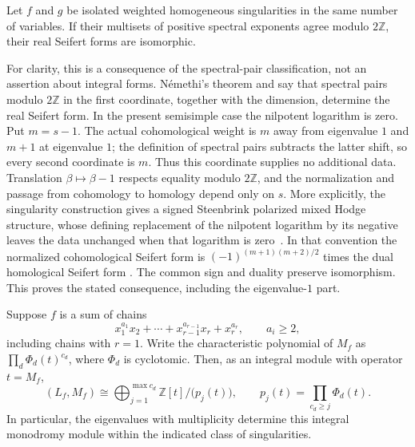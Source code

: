 \begin{theorem}\label{bg:real}
Let $f$ and $g$ be isolated weighted homogeneous singularities in the same
number of variables.  If their multisets of positive spectral exponents
agree modulo $2\mathbb Z$, their real Seifert forms are isomorphic.
\end{theorem}

For clarity, this is a consequence of the spectral-pair classification,
not an assertion about integral forms.  N\'emethi's theorem
\cite[Theorem~6.5]{Nemethi1995} and
\cite[Theorem~4.4(b)]{BalnojanHertling2019} say that spectral pairs modulo
$2\mathbb Z$ in the first coordinate, together with the dimension,
determine the real Seifert form.  In the present semisimple case the
nilpotent logarithm is zero.  Put $m=s-1$.  The actual cohomological weight
is $m$ away from eigenvalue $1$ and $m+1$ at eigenvalue $1$; the definition
of spectral pairs subtracts the latter shift, so every second coordinate
is $m$.  Thus this coordinate supplies no additional data.  Translation
$\beta\mapsto\beta-1$ respects equality modulo $2\mathbb Z$, and the
normalization and passage from cohomology to homology depend only on $s$.
More explicitly, the singularity construction gives a signed Steenbrink
polarized mixed Hodge structure, whose defining replacement of the
nilpotent logarithm by its negative leaves the data unchanged when that
logarithm is zero~\cite[Definition~6.1 and Remark~6.2]{BalnojanHertling2019}.
In that convention the normalized cohomological Seifert form is
$(-1)^{(m+1)(m+2)/2}$ times the dual homological Seifert form
\cite[Equation~(6.14)]{BalnojanHertling2019}.  The common sign and duality
preserve isomorphism.  This proves the stated consequence, including the
eigenvalue-$1$ part.

\begin{theorem}\label{bg:orlik}
Suppose $f$ is a sum of chains
\[
 x_1^{a_1}x_2+\cdots+x_{r-1}^{a_{r-1}}x_r+x_r^{a_r},
 \qquad a_i\geq2,
\]
including chains with $r=1$.  Write the characteristic polynomial of
$M_f$ as $\prod_d\Phi_d(t)^{c_d}$, where $\Phi_d$ is cyclotomic.
Then, as an integral module with operator $t=M_f$,
\begin{equation}\label{eq:bg-orlik}
 (L_f,M_f)\cong
 \bigoplus_{j=1}^{\max c_d}\mathbb Z[t]/\bigl(p_j(t)\bigr),
 \qquad p_j(t)=\prod_{c_d\geq j}\Phi_d(t).
\end{equation}
In particular, the eigenvalues with multiplicity determine this integral
monodromy module within the indicated class of singularities.
\end{theorem}

